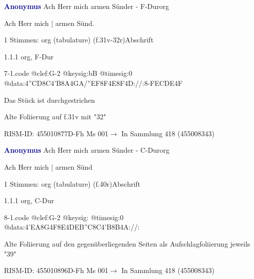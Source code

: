 \documentclass[twocolumn]{book}
\begin{document}
\par \vspace{7pt} \textcolor{darkblue}{\textbf{Anonymus  }}\hfillplus{\textbf{[7]}}\newline Ach Herr mich armen Sünder - F-Dur\newline org
\par \begin{itshape}[f.31v, at left:] Ach Herr mich | armen Sünd.\end{itshape} 
\par \textcolor{darkblue}{}  1 Stimmen: org (tabulature)  (f.31v-32r)\newline Abschrift
\par 1.1.1  org, F-Dur  
\begin{filecontents*}{7-1.code}
@clef:G-2
@keysig:bB
@timesig:0
@data:4''CD8C4'B8A4GA/''EF8F4E8F4D://:8-FEC{DE}4F
\end{filecontents*}
\newline
%
\par Das Stück ist durchgestrichen
\par Alte Foliierung auf f.31v mit "32"
\par RISM-ID: 455010877\newline D-Fh  Ms 001\newline $\rightarrow$ In Sammlung 418 (455008343)
      
\par \vspace{7pt} \textcolor{darkblue}{\textbf{Anonymus  }}\hfillplus{\textbf{[8]}}\newline Ach Herr mich armen Sünder - C-Dur\newline org
\par \begin{itshape}[f.40r, at left:] Ach Herr mich | armen Sünd\end{itshape} 
\par \textcolor{darkblue}{}  1 Stimmen: org (tabulature)  (f.40r)\newline Abschrift
\par 1.1.1  org, C-Dur  
\begin{filecontents*}{8-1.code}
@clef:G-2
@keysig:
@timesig:0
@data:4'EA8G4F8E4DEB''C8C4'B8B4A://:
\end{filecontents*}
\newline
%
\par Alte Foliierung auf den gegenüberliegenden Seiten als Aufschlagfoliierung jeweils "39"
\par RISM-ID: 455010896\newline D-Fh  Ms 001\newline $\rightarrow$ In Sammlung 418 (455008343)
      
\end{document}
